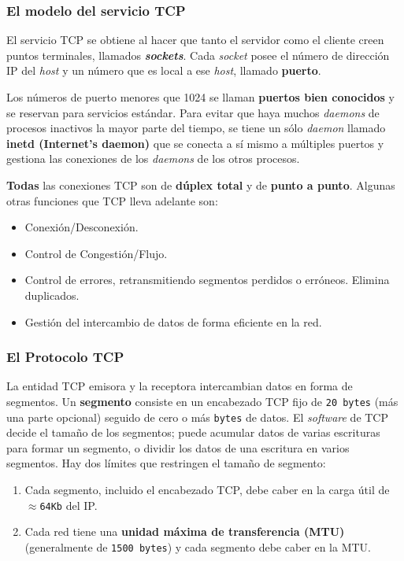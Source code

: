 \documentclass[10pt,a4paper]{article}
\begin{document}
\subsubsection{El modelo del servicio TCP}

El servicio TCP se obtiene al hacer que tanto el servidor como el cliente creen puntos terminales, llamados \textbf{\textit{sockets}}. Cada \textit{socket} posee el número de dirección IP del \textit{host} y un número que es local a ese \textit{host}, llamado \textbf{puerto}. 

Los números de puerto menores que 1024 se llaman \textbf{puertos bien conocidos} y se reservan para servicios estándar. Para evitar que haya muchos \textit{daemons} de procesos inactivos la mayor parte del tiempo, se tiene un sólo \textit{daemon} llamado \textbf{inetd (Internet's daemon)} que se conecta a sí mismo a múltiples puertos y gestiona las conexiones de los \textit{daemons} de los otros procesos.

\textbf{Todas} las conexiones TCP son de \textbf{dúplex total} y de \textbf{punto a punto}. Algunas otras funciones que TCP lleva adelante son:

\begin{itemize}
\item Conexión/Desconexión.
\item Control de Congestión/Flujo.
\item Control de errores, retransmitiendo segmentos perdidos o erróneos. Elimina duplicados.
\item Gestión del intercambio de datos de forma eficiente en la red.
\end{itemize}

\subsubsection{El Protocolo TCP}

La entidad TCP emisora y la receptora intercambian datos en forma de segmentos. Un \textbf{segmento} consiste en un encabezado TCP fijo de \texttt{20 bytes} (más una parte opcional) seguido de cero o más \texttt{bytes} de datos. El \textit{software} de TCP decide el tamaño de los segmentos; puede acumular datos de varias escrituras para formar un segmento, o dividir los datos de una escritura en varios segmentos. Hay dos límites que restringen el tamaño de segmento:
\begin{enumerate} 
\item Cada segmento, incluido el encabezado TCP, debe caber en la carga útil de $\approx$\texttt{64Kb} del IP.
\item Cada red tiene una \textbf{unidad máxima de transferencia (MTU)} (generalmente de \texttt{1500 bytes}) y cada segmento debe caber en la MTU.
\end{enumerate}
\end{document}
